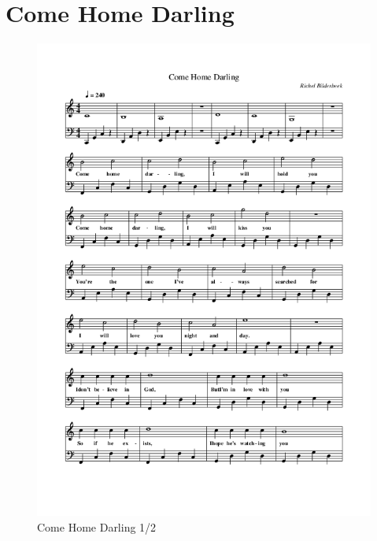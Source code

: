 \section{Come Home Darling}



\begin{figure}[!htbp]
  \includegraphics[width=\textwidth,height=\textheight,keepaspectratio]{../songs/14_come_home_darling_1.png}
  \caption{Come Home Darling 1/2}
  \label{fig:14_come_home_darling_1}
\end{figure}

